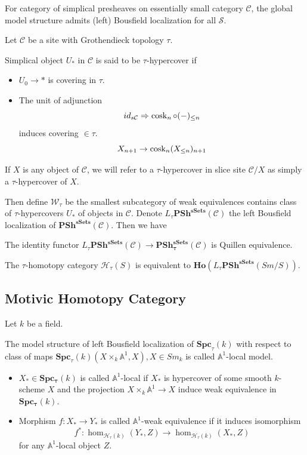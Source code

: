 \documentclass[b5paper,10pt]{article}
\begin{document}
\begin{secthm}
	For category of simplical presheaves on essentially small category $\mathcal{C}$, the global model structure admits (left) Bousfield localization for all $\mathcal{S}$.
\end{secthm}
Let $\mathcal{C}$ be a site with Grothendieck topology $\tau$. 
\begin{secdefn}
	Simplical object $U_*$ in $\mathcal{C}$ is said to be $\tau$-hypercover if 
	\begin{itemize}
		\item $U_0 \to *$ is covering in $\tau$.
		\item  The unit of adjunction
		\[
		id_{s\mathcal{C}} \Rightarrow \operatorname{cosk}_n \circ (-)_{\leq n}
		\]
		induces covering $\in \tau$.
		\[
		X_{n+1} \to 
		\operatorname{cosk}_n(X_{\leq n})_{n+1}
		\]
	\end{itemize}
If $X$ is any object of $\mathcal{C}$, we will refer to a $\tau$-hypercover in slice site $\mathcal{C}/X$ as simply a $\tau$-hypercover of $X$.
\end{secdefn}

Then define $\mathcal{W}_\tau$ be the smallest subcategory of weak equivalences contains class of $\tau$-hypercovers $U_*$ of objects in $\mathcal{C}$. Denote $L_\tau \mathbf{PSh^{sSets}}(\mathcal{C})$ the left Bousfield localization of $\mathbf{PSh^{sSets}}(\mathcal{C})$. Then we have
\begin{secthm}
	The identity functor $L_{\tau} \mathbf{PSh^{sSets}}(\mathcal{C}) \to \mathbf{PSh^{sSets}_\tau}(\mathcal{C})$ is Quillen equivalence.
\end{secthm}
\begin{seccor}
	The $\tau$-homotopy category $\mathcal{H}_\tau(S)$ is equivalent to $\mathbf{Ho}(L_\tau \mathbf{PSh^{sSets}}(Sm/S))$.
\end{seccor}
\subsection{Motivic Homotopy Category}
Let $k$ be a field.
\begin{secdefn}
	The model structure of left Bousfield localization of $\mathbf{Spc}_\tau(k)$ with respect to class of maps $\mathbf{Spc}_\tau(k)(X \times_k \mathbb{A}^1, X), X \in Sm_k$ is called \emph{$\mathbb{A}^1$}-local model.
	\begin{itemize}
		\item $X_* \in \mathbf{Spc_\tau}(k) $ is called $\mathbb{A}^1$-local if $X_*$ is hypercover of some smooth $k$-scheme $X$ and the projection $X \times_k \mathbb{A}^1 \to X$ induce weak equivalence in $\mathbf{Spc_\tau}(k)$.
		\item Morphism $f: X_* \to Y_*$  is called $\mathbb{A}^1$-weak equivalence if it induces
		isomorphism
		\[
		f^* \colon \hom_{\mathcal{H}_\tau(k)}(Y_*, Z) \to \hom_{\mathcal{H}_\tau(k)}(X_*,Z)
		\]
		for any $\mathbb{A}^1$-local object $Z$.
	\end{itemize}
\end{secdefn}
\end{document}
